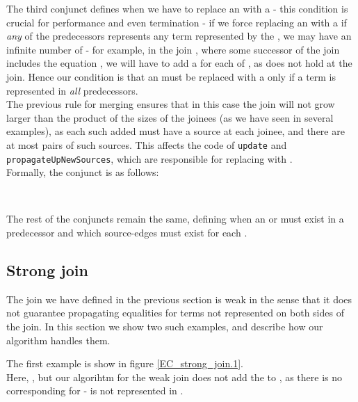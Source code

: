 \noindent
The third conjunct defines when we have to replace an \RGFA{} with a \GT{} - this condition is crucial for performance and even termination - if we force replacing an \RGFA{} with a \GT{} if \emph{any} of the predecessors represents any term represented by the \RGFA{}, we may have an infinite number of \GTs{} - for example, in the join , where some successor of the join includes the equation , we will have to add a \GT{} for each of , as  does not hold at the join. 
Hence our condition is that an \RGFA{} must be replaced with a \GT{} only if a term is represented in \emph{all} predecessors.\\
The previous rule for merging \GTs{} ensures that in this case the join will not grow larger than the product of the sizes of the joinees (as we have seen in several examples), as each such added \GT{} must have a source at each joinee, and there are at most  pairs of such sources. This affects the code of \lstinline|update| and \lstinline|propagateUpNewSources|, which are responsible for replacing \RGFAs{} with \GTs{}.\\
Formally, the conjunct is as follows:
\begin{figure}[H]
\\
\end{figure}

The rest of the conjuncts remain the same, defining when an \RGFA{} or \GFA{} must exist in a predecessor and which source-edges must exist for each \GT{}.

\subsection{Strong join}
The join we have defined in the previous section is weak in the sense that it does not guarantee propagating equalities for terms not represented on both sides of the join. In this section we show two such examples, and describe how our algorithm handles them.


\bigskip
\noindent
The first example is show in figure \ref{EC_strong_join.1}.\\
Here, , but our algorihtm for the weak join does not add the \GFA{}  to , as there is no corresponding \GFA{} for  -  is not represented in .

